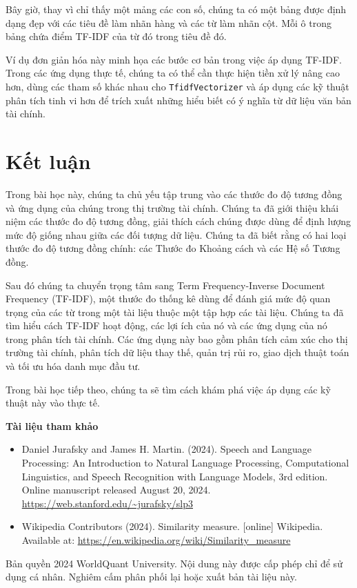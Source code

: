 Bây giờ, thay vì chỉ thấy một mảng các con số, chúng ta có một bảng được định dạng đẹp với các tiêu đề làm nhãn hàng và các từ làm nhãn cột. Mỗi ô trong bảng chứa điểm TF-IDF của từ đó trong tiêu đề đó.

Ví dụ đơn giản hóa này minh họa các bước cơ bản trong việc áp dụng TF-IDF. Trong các ứng dụng thực tế, chúng ta có thể cần thực hiện tiền xử lý nâng cao hơn, dùng các tham số khác nhau cho \texttt{TfidfVectorizer} và áp dụng các kỹ thuật phân tích tinh vi hơn để trích xuất những hiểu biết có ý nghĩa từ dữ liệu văn bản tài chính.

\section{Kết luận}

Trong bài học này, chúng ta chủ yếu tập trung vào các thước đo độ tương đồng và ứng dụng của chúng trong thị trường tài chính. Chúng ta đã giới thiệu khái niệm các thước đo độ tương đồng, giải thích cách chúng được dùng để định lượng mức độ giống nhau giữa các đối tượng dữ liệu. Chúng ta đã biết rằng có hai loại thước đo độ tương đồng chính: các Thước đo Khoảng cách và các Hệ số Tương đồng.

Sau đó chúng ta chuyển trọng tâm sang Term Frequency-Inverse Document Frequency (TF-IDF), một thước đo thống kê dùng để đánh giá mức độ quan trọng của các từ trong một tài liệu thuộc một tập hợp các tài liệu. Chúng ta đã tìm hiểu cách TF-IDF hoạt động, các lợi ích của nó và các ứng dụng của nó trong phân tích tài chính. Các ứng dụng này bao gồm phân tích cảm xúc cho thị trường tài chính, phân tích dữ liệu thay thế, quản trị rủi ro, giao dịch thuật toán và tối ưu hóa danh mục đầu tư.

Trong bài học tiếp theo, chúng ta sẽ tìm cách khám phá việc áp dụng các kỹ thuật này vào thực tế.

\textbf{Tài liệu tham khảo}

\begin{itemize}
  \item Daniel Jurafsky and James H. Martin. (2024). Speech and Language Processing: An Introduction to Natural Language Processing, Computational Linguistics, and Speech Recognition with Language Models, 3rd edition. Online manuscript released August 20, 2024. \url{https://web.stanford.edu/~jurafsky/slp3}
  \item Wikipedia Contributors (2024). Similarity measure. [online] Wikipedia. Available at: \url{https://en.wikipedia.org/wiki/Similarity_measure}
\end{itemize}

Bản quyền 2024 WorldQuant University. Nội dung này được cấp phép chỉ để sử dụng cá nhân. Nghiêm cấm phân phối lại hoặc xuất bản tài liệu này.

